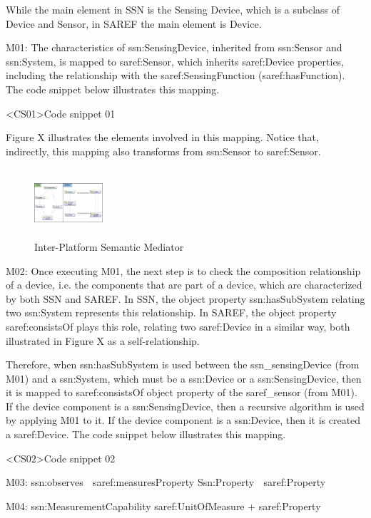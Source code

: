 \documentclass{sig-alternate-05-2015}
\begin{document}
While the main element in SSN is the Sensing Device, which is a subclass of Device and Sensor, in SAREF the main element is Device. 

M01: The characteristics of ssn:SensingDevice, inherited from ssn:Sensor and ssn:System, is mapped to saref:Sensor, which inherits saref:Device properties, including the relationship with the saref:SensingFunction (saref:hasFunction). The code snippet below illustrates this mapping.   

<CS01>Code snippet 01

Figure X illustrates the elements involved in this mapping. Notice that, indirectly, this mapping also transforms from ssn:Sensor to saref:Sensor.

\begin{figure}
\centering
\includegraphics[height=1in, width=1in]{SSN_SAREF_SensingDevice_Device}
\caption{Inter-Platform Semantic Mediator}
\end{figure}


M02: Once executing M01, the next step is to check the composition relationship of a device, i.e. the components that are part of a device, which are characterized by both SSN and SAREF. In SSN, the object property ssn:hasSubSystem relating two ssn:System represents this relationship. In SAREF, the object property saref:consistsOf plays this role, relating two saref:Device in a similar way, both illustrated in Figure X as a self-relationship. 

Therefore, when ssn:hasSubSystem is used between the ssn\_sensingDevice (from M01) and a ssn:System, which must be a ssn:Device or a ssn:SensingDevice, then it is mapped to saref:consistsOf object property of the saref\_sensor (from M01). If the device component is a ssn:SensingDevice, then a recursive algorithm is used by applying M01 to it. If the device component is a ssn:Device, then it is created a saref:Device. The code snippet below illustrates this mapping.

<CS02>Code snippet 02

M03: ssn:observes  saref:measuresProperty
Ssn:Property  saref:Property

M04: ssn:MeasurementCapability
saref:UnitOfMeasure + saref:Property
\end{document}
